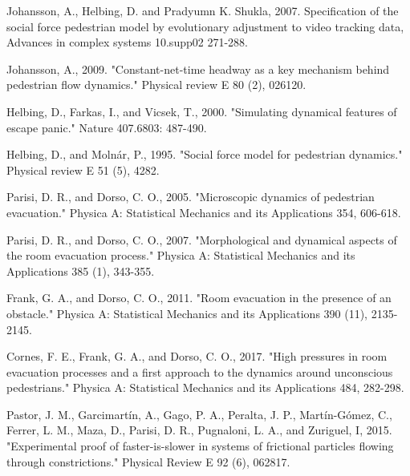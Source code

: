 \documentclass[preprint,12pt]{elsarticle}
\begin{document}
\begin{thebibliography}{10}
Johansson, A., Helbing, D. and Pradyumn K. Shukla, 2007. Specification of 
the social force pedestrian model by evolutionary adjustment to video tracking 
data, Advances in complex systems 10.supp02 271-288. 
{}

Johansson, A., 2009. "Constant-net-time headway as a key mechanism behind 
pedestrian flow dynamics." Physical review E 80 (2), 026120. 
{}

Helbing, D., Farkas, I., and Vicsek, T., 2000. "Simulating dynamical 
features of escape panic." Nature 407.6803: 487-490. 
{}

Helbing, D., and Moln\'ar, P., 1995. "Social force model for pedestrian 
dynamics." Physical review E 51 (5), 4282. 
{}

Parisi, D. R., and Dorso, C. O., 2005. "Microscopic dynamics of pedestrian 
evacuation." Physica A: Statistical Mechanics and its Applications 354, 
606-618. {}

Parisi, D. R., and Dorso, C. O., 2007. "Morphological and dynamical 
aspects of the room evacuation process." Physica A: Statistical Mechanics and 
its Applications 385 (1), 343-355. 
{}

Frank, G. A., and Dorso, C. O., 2011. "Room evacuation in 
the presence of an obstacle." Physica A: Statistical Mechanics and its 
Applications 390 (11), 2135-2145. 
{}

Cornes, F. E., Frank, G. A., and Dorso, C. O., 2017. "High pressures in room 
evacuation processes and a first approach to the dynamics around unconscious 
pedestrians." Physica A: Statistical Mechanics and its Applications 484, 
282-298. {}

Pastor, J. M., Garcimart\'in, A., Gago, P. A., Peralta, J. P., 
Mart\'in-Gómez, C., Ferrer, L. M., Maza, D., Parisi, D. R., Pugnaloni, L. A., 
and Zuriguel, I, 2015. "Experimental proof of faster-is-slower in systems of 
frictional particles flowing through constrictions." Physical Review E 92 (6), 
062817. {}


\end{thebibliography}
\end{document}
